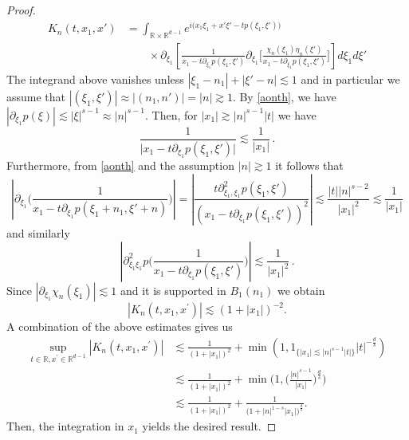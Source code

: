 \documentclass[10pt,leqno]{amsart}
\newcommand{\R}{\mathbb{R}}
\numberwithin{equation}{section}
\begin{document}
\begin{proof}
\begin{align*}
K_n(t,x_1 ,x')
&= \int_{\R \times \R^{d-1}}  e^{i\big(x_1 \xi_1 +x' \xi'-t p (\xi_1, \xi') \big)} 
\\
&\qquad \times
\partial_{\xi_{1}} \left[ \frac{1}{x_1 - t\partial_{\xi_{1}}p(\xi_1, \xi')} 
\partial_{\xi_{1}}\Big[\frac{\chi_n(\xi_1) \eta_n (\xi')}{x_1 - t\partial_{\xi_{1}}p(\xi_1, \xi')} \Big]\right] d\xi_1 d\xi'
\end{align*}
The integrand above vanishes unless \(|\xi_{1}-n_{1}|+|\xi'-n|\lesssim1\) and in particular we assume that \(|(\xi_{1},\xi')|\approx|(n_{1},n')|=|n|\gtrsim1\).
By \eqref{aonth}, we have 
 $|\partial_{\xi_{1}}p(\xi)| \lesssim | \xi |^{s-1}\approx |n|^{s-1}$. Then, for  \(|x_{1}|\gtrsim|n|^{s-1}|t|\) we have 
\begin{equation*}
\frac{1}{\big|x_1 - t\partial_{\xi_{1}}p(\xi_1, \xi')\big|}\lesssim\frac{1}{|x_{1}|} \,.
\end{equation*}
Furthermore, from \eqref{aonth} and the assumption $|n| \gtrsim 1$ it follows that
\begin{equation*}
\left| \partial_{\xi_1} \Big( \frac{1}{x_1 - t\partial_{\xi_{1}}p(\xi_1+n_1, \xi' + n)} \Big) \right| =
\left| \frac{t\partial_{\xi_{1},\xi_{1}}^{2}p(\xi_1, \xi')}{(x_1 - t\partial_{\xi_{1}}p(\xi_1, \xi'))^2} \right|
\lesssim \frac{|t||n|^{s-2}}{|x_1|^{2}}
 \lesssim \frac{1}{|x_1|}
\end{equation*}
and similarly
$$
\left| \partial^2_{\xi_1\xi_1}p \Big( \frac{1}{x_1 - t\partial_{\xi_{1}}p(\xi_1, \xi')} \Big) \right|
 \lesssim \frac{1}{|x_1|^2} \,.
$$
Since $|\partial_{\xi_1} \chi_n(\xi_1)| \lesssim 1$ and it is supported in \(B_{1}(n_{1})\) we obtain
$$|K_n(t,x_1 ,x^\prime )|\lesssim    (1+ |x_1| )^{-2}.$$
A combination of the above estimates gives us
\begin{align*}
\sup_{t\in \R , x^\prime \in \R^{d-1}} |K_n (t,x_1, x^\prime)|& \lesssim \frac{1}{(1+ |x_1|)^{2}}  +\min (1 , 1_{\{|x_1| \lesssim |n|^{s - 1} |t|\} }  |t|^{-\frac{d}{s}})\\
& \lesssim \frac{1}{(1+ |x_1|)^{2}}  + \min \bigg(1 ,  \bigg(\frac{|n|^{s - 1}}{|x_1|}\bigg)^{\frac{d}{s} } \bigg)\\
&\lesssim \frac{1}{(1+ |x_1|)^{2}}  +\frac{1}{\Big(1+|n|^{1-s}|x_1|\Big)^{\frac{d}{s}}}
.
\end{align*}
Then, the integration in $x_1$ yields the desired result.
\end{proof}
\end{document}
